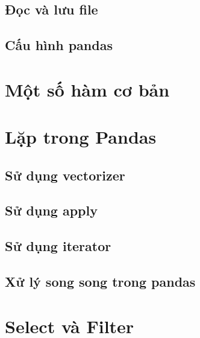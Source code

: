 \documentclass[
]{book}
\begin{document}
\hypertarget{ux111ux1ecdc-vuxe0-lux1b0u-file}{%
\section{Đọc và lưu file}\label{ux111ux1ecdc-vuxe0-lux1b0u-file}}

\hypertarget{cux1ea5u-huxecnh-pandas}{%
\section{Cấu hình pandas}\label{cux1ea5u-huxecnh-pandas}}

\hypertarget{mux1ed9t-sux1ed1-huxe0m-cux1a1-bux1ea3n}{%
\chapter{Một số hàm cơ bản}\label{mux1ed9t-sux1ed1-huxe0m-cux1a1-bux1ea3n}}

\hypertarget{lux1eb7p-trong-pandas}{%
\chapter{Lặp trong Pandas}\label{lux1eb7p-trong-pandas}}

\hypertarget{sux1eed-dux1ee5ng-vectorizer}{%
\section{Sử dụng vectorizer}\label{sux1eed-dux1ee5ng-vectorizer}}

\hypertarget{sux1eed-dux1ee5ng-apply}{%
\section{Sử dụng apply}\label{sux1eed-dux1ee5ng-apply}}

\hypertarget{sux1eed-dux1ee5ng-iterator}{%
\section{Sử dụng iterator}\label{sux1eed-dux1ee5ng-iterator}}

\hypertarget{xux1eed-luxfd-song-song-trong-pandas}{%
\section{Xử lý song song trong pandas}\label{xux1eed-luxfd-song-song-trong-pandas}}

\hypertarget{select-vuxe0-filter}{%
\chapter{Select và Filter}\label{select-vuxe0-filter}}
\end{document}
